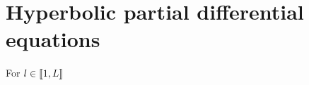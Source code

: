 \documentclass[12pt]{article}
\begin{document}
\maketitle


\section{Hyperbolic partial differential equations}

For $l \in \llbracket 1, L \rrbracket$
\end{document}
